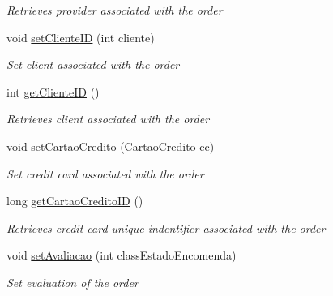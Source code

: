 \begin{DoxyCompactItemize}
\begin{DoxyCompactList}\small\item\em Retrieves provider associated with the order \end{DoxyCompactList}\item 
void \mbox{\hyperlink{classmvc_j_j_m_s_1_1_models_1_1_encomenda_a8793456fc672ea1a6a956f8300b8b590}{set\+Cliente\+ID}} (int cliente)
\begin{DoxyCompactList}\small\item\em Set client associated with the order \end{DoxyCompactList}\item 
int \mbox{\hyperlink{classmvc_j_j_m_s_1_1_models_1_1_encomenda_a2e776d2ce3ef684e288f83bf688d0dab}{get\+Cliente\+ID}} ()
\begin{DoxyCompactList}\small\item\em Retrieves client associated with the order \end{DoxyCompactList}\item 
void \mbox{\hyperlink{classmvc_j_j_m_s_1_1_models_1_1_encomenda_a81d9aa8e00962a0e7e9d9908c2ab9ae1}{set\+Cartao\+Credito}} (\mbox{\hyperlink{classmvc_j_j_m_s_1_1_models_1_1_cartao_credito}{Cartao\+Credito}} cc)
\begin{DoxyCompactList}\small\item\em Set credit card associated with the order \end{DoxyCompactList}\item 
long \mbox{\hyperlink{classmvc_j_j_m_s_1_1_models_1_1_encomenda_a8d320ae133bda1cc87a7d8d5fe616c52}{get\+Cartao\+Credito\+ID}} ()
\begin{DoxyCompactList}\small\item\em Retrieves credit card unique indentifier associated with the order \end{DoxyCompactList}\item 
void \mbox{\hyperlink{classmvc_j_j_m_s_1_1_models_1_1_encomenda_ac623b774ed27b93b0c082a1a093b8e1f}{set\+Avaliacao}} (int class\+Estado\+Encomenda)
\begin{DoxyCompactList}\small\item\em Set evaluation of the order \end{DoxyCompactList}\end{DoxyCompactItemize}
